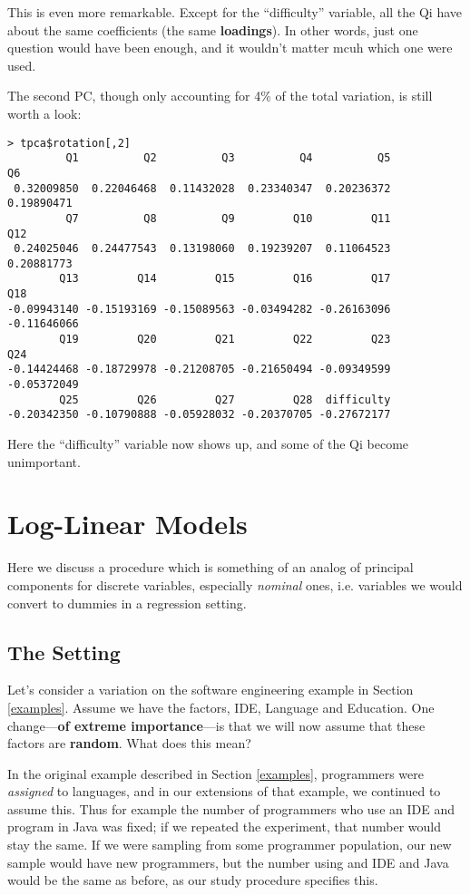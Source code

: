 This is even more remarkable.  Except for the ``difficulty'' variable,
all the Qi have about the same coefficients (the same {\bf loadings}).
In other words, just one question would have been enough, and it
wouldn't matter mcuh which one were used.

The second PC, though only accounting for 4\% of the total variation, is
still worth a look:

\begin{lstlisting}
> tpca$rotation[,2]
         Q1          Q2          Q3          Q4          Q5          Q6 
 0.32009850  0.22046468  0.11432028  0.23340347  0.20236372  0.19890471 
         Q7          Q8          Q9         Q10         Q11         Q12 
 0.24025046  0.24477543  0.13198060  0.19239207  0.11064523  0.20881773 
        Q13         Q14         Q15         Q16         Q17         Q18 
-0.09943140 -0.15193169 -0.15089563 -0.03494282 -0.26163096 -0.11646066 
        Q19         Q20         Q21         Q22         Q23         Q24 
-0.14424468 -0.18729978 -0.21208705 -0.21650494 -0.09349599 -0.05372049 
        Q25         Q26         Q27         Q28  difficulty 
-0.20342350 -0.10790888 -0.05928032 -0.20370705 -0.27672177 
\end{lstlisting}

Here the ``difficulty'' variable now shows up, and some of the Qi become
unimportant.

\section{Log-Linear Models}
\label{loglin}

Here we discuss a procedure which is something of an analog of principal
components for discrete variables, especially {\it nominal} ones, i.e.
variables we would convert to dummies in a regression setting.

\subsection{The Setting}

Let's consider a variation on the software engineering example in
Section \ref{examples}.  Assume we have the factors, IDE, Language and
Education.  One change---{\bf of extreme importance}---is that we will
now assume that these factors are {\bf random}.  What does this mean?

In the original example described in Section \ref{examples}, programmers
were {\it assigned} to languages, and in our extensions of that example,
we continued to assume this.  Thus for example the number of programmers
who use an IDE and program in Java was fixed; if we repeated the
experiment, that number would stay the same.  If we were sampling from
some programmer population, our new sample would have new programmers,
but the number using and IDE and Java would be the same as before, as
our study procedure specifies this.


